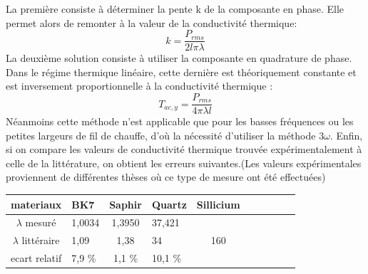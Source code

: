 \documentclass[10pt,a4paper]{report}
\begin{document}
\newline
\newline
La première consiste à déterminer la pente k de la composante en phase. Elle permet alors de remonter à la valeur de la conductivité thermique:
\begin{equation}
k=\frac{P_{rms}}{2l\pi \lambda}
\end{equation}
\newline
La deuxième solution consiste à utiliser la composante en quadrature de phase. Dans le régime thermique linéaire, cette dernière est théoriquement constante et est inversement proportionnelle à la conductivité thermique :
\begin{equation}
T_{ac,y}=\frac{P_{rms}}{4\pi \lambda l}
\end{equation}
Néanmoins cette méthode n'est applicable que pour les basses fréquences ou les petites largeurs de fil de chauffe, d'où la nécessité d'utiliser la méthode 3$\omega$.
\newline
\newline
Enfin, si on compare les valeurs de conductivité thermique trouvée expérimentalement à celle de la littérature, on obtient les erreurs suivantes.(Les valeurs expérimentales proviennent de différentes thèses où ce type de mesure ont été effectuées)
\begin{center}
\begin{tabular}{|c|p{3cm}|c|p{3cm}|c|p{3cm}|c|p{3cm}||c|p{3cm}|}\hline
materiaux & BK7 & Saphir & Quartz & Sillicium\\\hline
$\lambda$ mesuré & 1,0034  & 1,3950 & 37,421\\\hline
$\lambda$ littéraire &  1,09 & 1,38 & 34 & 160\\\hline
ecart relatif & 7,9 \% & 1,1 \% & 10,1 \% & \\\hline
\end{tabular}
\end{center}
\end{document}
